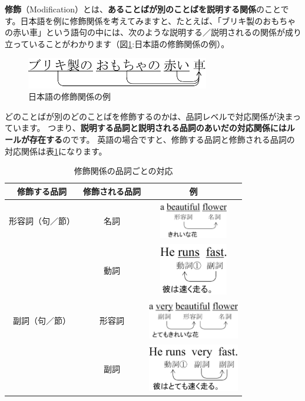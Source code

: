\documentclass[12pt,titlepage]{jsarticle}
\begin{document}
 {\bf 修飾}（Modification）とは、{\bf あることばが別のことばを説明する関係}のことです。日本語を例に修飾関係を考えてみますと、たとえば、「ブリキ製のおもちゃの赤い車」という語句の中には、次のような説明する／説明されるの関係が成り立っていることがわかります（図\ref{fig13}:日本語の修飾関係の例）。
  \begin{figure}[htbp]
   \begin{center}
    \includegraphics[width=8cm]{./figure/fig13.pdf}
    \caption{日本語の修飾関係の例}
    \label{fig13}
   \end{center}
  \end{figure}
 
 どのことばが別のどのことばを修飾するのかは、品詞レベルで対応関係が決まっています。
 つまり、{\bf 説明する品詞と説明される品詞のあいだの対応関係にはルールが存在する}のです。
 英語の場合ですと、修飾する品詞と修飾される品詞の対応関係は表\ref{tab3}になります。
 \begin{table}[htbp]
  \begin{center}
   \caption{修飾関係の品詞ごとの対応}
   \begin{tabular}{|c|c|c|}
    \hline
    修飾する品詞 & 修飾される品詞 & 例 \\ \hline \hline
    形容詞（句／節） & 名詞 & \includegraphics[width=3cm]{./figure/tab3_1.pdf} \\
    \hline
    & 動詞 & \includegraphics[width=3cm]{./figure/tab3_2.pdf} \\ \cline{2-3}
    副詞（句／節）& 形容詞 & \includegraphics[width=4cm]{./figure/tab3_3.pdf} \\ \cline{2-3}
    & 副詞 & \includegraphics[width=4cm]{./figure/tab3_4.pdf} \\ \hline
   \end{tabular}
   \label{tab3}
  \end{center}
 \end{table}
\end{document}
